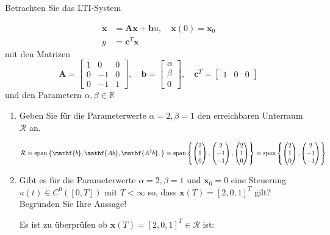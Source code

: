 \documentclass[crop=false]{standalone}
\begin{document}
\begin{task}
Betrachten Sie das LTI-System

$$ 
\begin{aligned} \dot{\mathbf{x}} &=\mathbf{A x}+\mathbf{b} u, \quad \mathbf{x}(0)=\mathbf{x}_{0} \\ y &=\mathbf{c}^{T} \mathbf{x} \end{aligned}
 $$
mit den Matrizen
\[
\mathbf{A}=\left[\begin{array}{ccc}{1} & {0} & {0} \\ {0} & {-1} & {0} \\ {0} & {-1} & {1}\end{array}\right], \quad \mathbf{b}=\left[\begin{array}{c}{\alpha} \\ {\beta} \\ {0}\end{array}\right], \quad \mathbf{c}^{T}=\left[\begin{array}{lll}{1} & {0} & {0}\end{array}\right]
\]
und den Parametern $\alpha, \beta \in \mathbb{R}$
 \begin{enumerate}[i]
  \item Geben Sie für die Parameterwerte $\alpha=2, \beta=1$ den erreichbaren Unterraum $\mathcal{R}$ an.
\begin{solution}
\[ \mathcal{R} = \text{span}\left\{ \matbf{b}, \matbf{Ab}, \matbf{A^2 b}, \right\} =
\text{span}\left\{
\begin{pmatrix}
2 \\ 1 \\ 0
\end{pmatrix},
\begin{pmatrix}
2 \\ -1 \\ -1
\end{pmatrix},
\begin{pmatrix}
2 \\ 1 \\ 0
\end{pmatrix}
 \right\}
 =\text{span}\left\{
\begin{pmatrix}
2 \\ 1 \\ 0
\end{pmatrix},
\begin{pmatrix}
2 \\ -1 \\ -1
\end{pmatrix}
 \right\}
 \]
\end{solution}
  \item Gibt es für die Parameterwerte $\alpha=2, \beta=1$ und $\mathbf{x}_{0}=0$ eine Steuerung $u(t) \in C^{0}([0, T])$ mit $T<\infty$ so, dass $\mathbf{x}(T)=[2,0,1]^{T}$ gilt? Begründen Sie Ihre Aussage!
\begin{solution}
Es ist zu überprüfen ob $\mathbf{x}(T)=[2,0,1]^{T} \in \mathcal{R}$ ist:


\end{solution}
\end{enumerate}
\end{task}
\end{document}
